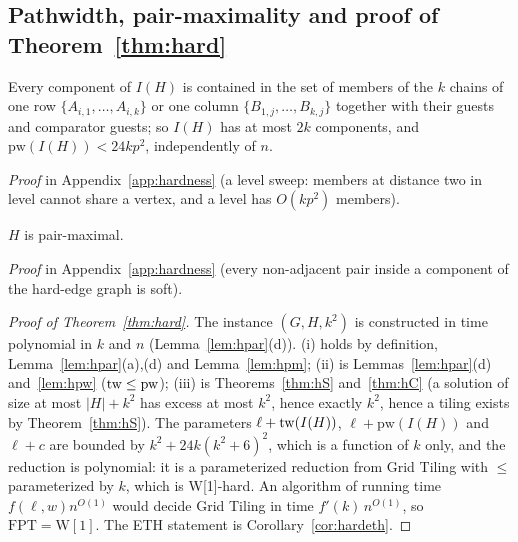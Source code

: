 \subsection{Pathwidth, pair-maximality and proof of Theorem~\ref{thm:hard}}\label{sec:hpwpm}
\begin{lemma}[Pathwidth]\label{lem:hpw}
Every component of $I(H)$ is contained in the set of members of the $k$ chains of one row $\{A_{i,1},\dots,A_{i,k}\}$ or one column $\{B_{1,j},\dots,B_{k,j}\}$ together with their guests and comparator guests; so $I(H)$ has at most $2k$ components, and $\mathrm{pw}(I(H))<24kp^2$, independently of $n$.
\end{lemma}
\emph{Proof} in Appendix~\ref{app:hardness} (a level sweep: members at distance two in level cannot share a vertex, and a level has $O(kp^2)$ members).

\begin{lemma}\label{lem:hpm}
$H$ is pair-maximal.
\end{lemma}
\emph{Proof} in Appendix~\ref{app:hardness} (every non-adjacent pair inside a component of the hard-edge graph is soft).

\begin{proof}[Proof of Theorem~\ref{thm:hard}]
The instance $(G,H,k^2)$ is constructed in time polynomial in $k$ and $n$ (Lemma~\ref{lem:hpar}(d)). (i) holds by definition, Lemma~\ref{lem:hpar}(a),(d) and Lemma~\ref{lem:hpm}; (ii) is Lemmas~\ref{lem:hpar}(d) and~\ref{lem:hpw} ($\mathrm{tw}\le\mathrm{pw}$); (iii) is Theorems~\ref{thm:hS} and~\ref{thm:hC} (a solution of size at most $|H|+k^2$ has excess at most $k^2$, hence exactly $k^2$, hence a tiling exists by Theorem~\ref{thm:hS}). The parameters $\ell+\mathrm{tw}(I(H))$, $\ell+\mathrm{pw}(I(H))$ and $\ell+c$ are bounded by $k^2+24k(k^2+6)^2$, which is a function of $k$ only, and the reduction is polynomial: it is a parameterized reduction from Grid Tiling with $\le$ parameterized by $k$, which is W[1]-hard. An algorithm of running time $f(\ell,w)n^{O(1)}$ would decide Grid Tiling in time $f'(k)\,n^{O(1)}$, so $\mathrm{FPT}=\mathrm{W[1]}$. The ETH statement is Corollary~\ref{cor:hardeth}.
\end{proof}

